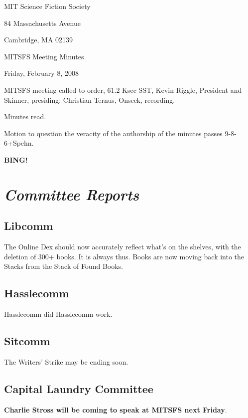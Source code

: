 \documentclass[10pt]{article}
\newcommand{\bing}{{\bf BING!} }
\newcommand{\goto}[1]{\bing \vskip 12pt \section*{{\em{#1}}}}
\begin{document}
\begin{center}

MIT Science Fiction Society

84 Massachusetts Avenue

Cambridge, MA 02139

\vspace{12pt}

MITSFS Meeting Minutes

Friday, February 8, 2008

\end{center}

\vspace{18pt}

\setlength{\parskip}{6pt}

\noindent
MITSFS meeting called to order, 61.2 Ksec SST,
Kevin Riggle, President and Skinner, presiding; Christian Ternus, Onseck, recording.

Minutes read.

\BING
Motion to question the veracity of the authorship of the minutes passes 9-8-6+Spehn.

\goto{Committee Reports}

\subsection*{Libcomm}

The Online Dex should now accurately reflect what's on the shelves,
with the deletion of 300+ books.  It is always thus.  Books are now
moving back into the Stacks from the Stack of Found Books.

\subsection*{Hasslecomm}

Hasslecomm did Hasslecomm work.

\subsection*{Sitcomm}

The Writers' Strike may be ending soon.

\subsection*{Capital Laundry Committee}

\textbf{Charlie Stross will be coming to speak at MITSFS next Friday}.
\end{document}
